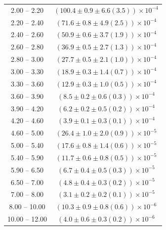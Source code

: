 \begin{table}
\begin{center}
\begin{tabular}{ c | c }
2.00 -- 2.20 & $(100.4\pm0.9\pm6.6(3.5))\times10^{-4}$ \\ 
2.20 -- 2.40 & $(71.6\pm0.8\pm4.9(2.5))\times10^{-4}$ \\ 
2.40 -- 2.60 & $(50.9\pm0.6\pm3.7(1.9))\times10^{-4}$ \\ 
2.60 -- 2.80 & $(36.9\pm0.5\pm2.7(1.3))\times10^{-4}$ \\ 
2.80 -- 3.00 & $(27.7\pm0.5\pm2.1(1.0))\times10^{-4}$ \\ 
3.00 -- 3.30 & $(18.9\pm0.3\pm1.4(0.7))\times10^{-4}$ \\ 
3.30 -- 3.60 & $(12.9\pm0.3\pm1.0(0.5))\times10^{-4}$ \\ 
3.60 -- 3.90 & $(8.5\pm0.2\pm0.6(0.3))\times10^{-4}$ \\ 
3.90 -- 4.20 & $(6.2\pm0.2\pm0.5(0.2))\times10^{-4}$ \\ 
4.20 -- 4.60 & $(3.9\pm0.1\pm0.3(0.1))\times10^{-4}$ \\ 
4.60 -- 5.00 & $(26.4\pm1.0\pm2.0(0.9))\times10^{-5}$ \\ 
5.00 -- 5.40 & $(17.6\pm0.8\pm1.4(0.6))\times10^{-5}$ \\ 
5.40 -- 5.90 & $(11.7\pm0.6\pm0.8(0.5))\times10^{-5}$ \\ 
5.90 -- 6.50 & $(6.7\pm0.4\pm0.5(0.3))\times10^{-5}$ \\ 
6.50 -- 7.00 & $(4.8\pm0.4\pm0.3(0.2))\times10^{-5}$ \\ 
7.00 -- 8.00 & $(3.1\pm0.2\pm0.2(0.1))\times10^{-5}$ \\ 
8.00 -- 10.00 & $(10.3\pm0.9\pm0.8(0.6))\times10^{-6}$ \\ 
10.00 -- 12.00 & $(4.0\pm0.6\pm0.3(0.2))\times10^{-6}$ \\ 
\hline
\end{tabular}
\end{center}
\end{table}
 
